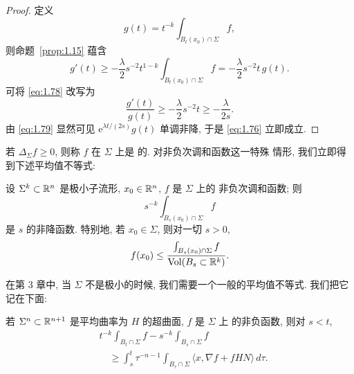 \begin{proof}
定义
\begin{equation}
g(t)=t^{-k}\int_{B_t(x_0)\cap\Sigma}f,
\label{eq:1.77}
\end{equation}
则命题~\ref{prop:1.15} 蕴含
\begin{equation}
g'(t)\geq-\frac{\lambda}{2}s^{-2}t^{1-k}
 \int_{B_t(x_0)\cap\Sigma}f
 =-\frac{\lambda}{2}s^{-2}t\,g(t).
\label{eq:1.78}
\end{equation}
可将 \eqref{eq:1.78} 改写为
\begin{equation}
\frac{g'(t)}{g(t)}\geq-\frac{\lambda}{2}s^{-2}t
 \geq-\frac{\lambda}{2s}.
\label{eq:1.79}
\end{equation}
由 \eqref{eq:1.79} 显然可见 $\mathrm{e}^{\lambda t/(2s)}g(t)$ 单调非降, 于是
\eqref{eq:1.76} 立即成立.
\end{proof}

若 $\Delta_{\Sigma}f\geq0$, 则称 $f$ 在 $\Sigma$ 上是
的. 对非负次调和函数这一特殊
情形, 我们立即得到下述平均值不等式:

\begin{corollary}
\label{cor:1.17}
设 $\Sigma^k\subset\mathbb{R}^n$ 是极小子流形, $x_0\in\mathbb{R}^n$, $f$ 是 $\Sigma$ 上的
非负次调和函数; 则
\begin{equation}
s^{-k}\int_{B_s(x_0)\cap\Sigma}f
\label{eq:1.80}
\end{equation}
是 $s$ 的非降函数. 特别地, 若 $x_0\in\Sigma$, 则对一切 $s>0$,
\begin{equation}
f(x_0)\leq\frac{\int_{B_s(x_0)\cap\Sigma}f}{\operatorname{Vol}(B_s\subset\mathbb{R}^k)}.
\label{eq:1.81}
\end{equation}
\end{corollary}

在第 3 章中, 当 $\Sigma$ 不是极小的时候, 我们需要一个一般的平均值不等式.
我们把它记在下面:

\begin{lemma}
\label{lem:1.18}
若 $\Sigma^n\subset\mathbb{R}^{n+1}$ 是平均曲率为 $H$ 的超曲面, $f$ 是 $\Sigma$ 上
的非负函数, 则对 $s<t$,
\begin{equation}
\begin{aligned}
&t^{-k}\int_{B_t\cap\Sigma}f-s^{-k}\int_{B_s\cap\Sigma}f\\
&\quad\geq\int_s^t\tau^{-n-1}\int_{B_\tau\cap\Sigma}
 \langle x,\nabla f+fHN\rangle\,d\tau.
\end{aligned}
\label{eq:1.82}
\end{equation}
\end{lemma}

